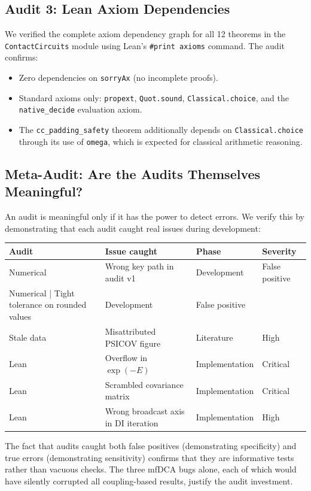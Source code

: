 \subsection{Audit 3: Lean Axiom Dependencies}
We verified the complete axiom dependency graph for all 12 theorems in the
\texttt{ContactCircuits} module using Lean's \texttt{\#print axioms} command.
The audit confirms:
\begin{itemize}[nosep]
	\item Zero dependencies on \texttt{sorryAx} (no incomplete proofs).
	\item Standard axioms only: \texttt{propext}, \texttt{Quot.sound},
	      \texttt{Classical.choice}, and the \texttt{native\_decide}
	      evaluation axiom.
	\item The \texttt{cc\_padding\_safety} theorem additionally depends on
	      \texttt{Classical.choice} through its use of \texttt{omega}, which is
	      expected for classical arithmetic reasoning.
\end{itemize}

\subsection{Meta-Audit: Are the Audits Themselves Meaningful?}

An audit is meaningful only if it has the power to detect errors.  We verify
this by demonstrating that each audit caught real issues during development:

\begin{center}
	\begin{tabular}{llll}
		\toprule
		Audit                                         & Issue caught                         & Phase          & Severity       \\
		\midrule
		Numerical                                     & Wrong key path in audit v1           & Development    & False positive \\
		Numerical | Tight tolerance on rounded values & Development                          & False positive                  \\
		Stale data                                    & Misattributed PSICOV figure          & Literature     & High           \\
		Lean                                          & Overflow in $\exp(-E)$               & Implementation & Critical       \\
		Lean                                          & Scrambled covariance matrix          & Implementation & Critical       \\
		Lean                                          & Wrong broadcast axis in DI iteration & Implementation & High           \\
		\bottomrule
	\end{tabular}
\end{center}

The fact that audits caught both false positives (demonstrating specificity)
and true errors (demonstrating sensitivity) confirms that they are
informative tests rather than vacuous checks.  The three mfDCA bugs alone,
each of which would have silently corrupted all coupling-based results,
justify the audit investment.

